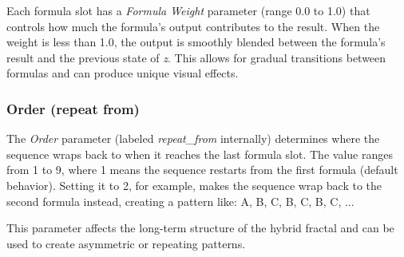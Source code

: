 Each formula slot has a \emph{Formula Weight} parameter (range 0.0 to 1.0) that controls how much the formula's output contributes to the result. When the weight is less than 1.0, the output is smoothly blended between the formula's result and the previous state of \emph{z}. This allows for gradual transitions between formulas and can produce unique visual effects.

\subsubsection{Order (repeat from)}

The \emph{Order} parameter (labeled \emph{repeat\_from} internally) determines where the sequence wraps back to when it reaches the last formula slot. The value ranges from 1 to 9, where 1 means the sequence restarts from the first formula (default behavior). Setting it to 2, for example, makes the sequence wrap back to the second formula instead, creating a pattern like: A, B, C, B, C, B, C, ...

This parameter affects the long-term structure of the hybrid fractal and can be used to create asymmetric or repeating patterns.
